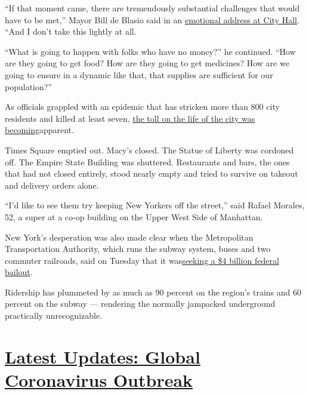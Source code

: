 ``If that moment came, there are tremendously substantial challenges
that would have to be met,'' Mayor Bill de Blasio said in an
\href{https://www.nytimes3xbfgragh.onion/video/nyregion/100000007039735/nyc-shelter-in-place-de-blasio.html}{emotional
address at City Hall}. ``And I don't take this lightly at all.

``What is going to happen with folks who have no money?'' he continued.
``How are they going to get food? How are they going to get medicines?
How are we going to ensure in a dynamic like that, that supplies are
sufficient for our population?''

As officials grappled with an epidemic that has stricken more than 800
city residents and killed at least seven,
\href{https://www.nytimes3xbfgragh.onion/2020/03/17/nyregion/coronavirus-new-york-update.html}{the
toll on the life of the city was becoming}apparent.

Times Square emptied out. Macy's closed. The Statue of Liberty was
cordoned off. The Empire State Building was shuttered. Restaurants and
bars, the ones that had not closed entirely, stood nearly empty and
tried to survive on takeout and delivery orders alone.

``I'd like to see them try keeping New Yorkers off the street,'' said
Rafael Morales, 52, a super at a co-op building on the Upper West Side
of Manhattan.

New York's desperation was also made clear when the Metropolitan
Transportation Authority, which runs the subway system, buses and two
commuter railroads, said on Tuesday that it
was\href{https://www.nytimes3xbfgragh.onion/2020/03/17/nyregion/coronavirus-nyc-subway-federal-aid-.html}{seeking
a \$4 billion federal bailout}.

Ridership has plummeted by as much as 90 percent on the region's trains
and 60 percent on the subway --- rendering the normally jampacked
underground practically unrecognizable.

\hypertarget{latest-updates-global-coronavirus-outbreak}{%
\section{\texorpdfstring{\href{https://www.nytimes3xbfgragh.onion/2020/08/04/world/coronavirus-cases.html?action=click\&pgtype=Article\&state=default\&region=MAIN_CONTENT_1\&context=storylines_live_updates}{Latest
Updates: Global Coronavirus
Outbreak}}{Latest Updates: Global Coronavirus Outbreak}}\label{latest-updates-global-coronavirus-outbreak}}

